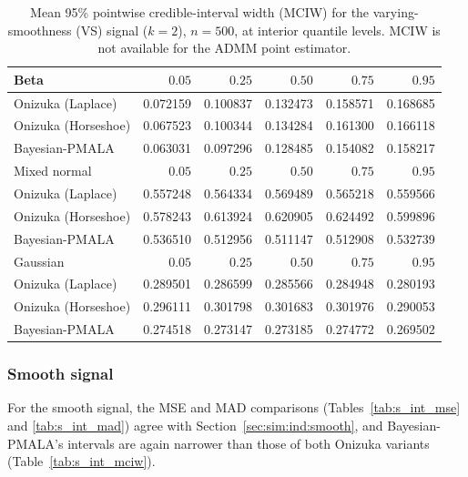 \begin{table}[!htbp]
\centering
\small
\caption{Mean 95\% pointwise credible-interval width (MCIW) for the varying-smoothness (VS) signal ($k=2$), $n=500$, at interior quantile levels. MCIW is not available for the ADMM point estimator.}
\label{tab:vs_int_mciw}
\begin{tabular}{lrrrrr}
\toprule
Beta & $0.05$ & $0.25$ & $0.50$ & $0.75$ & $0.95$ \\
\midrule
Onizuka (Laplace) & 0.072159 & 0.100837 & 0.132473 & 0.158571 & 0.168685 \\
Onizuka (Horseshoe) & 0.067523 & 0.100344 & 0.134284 & 0.161300 & 0.166118 \\
Bayesian-PMALA & 0.063031 & 0.097296 & 0.128485 & 0.154082 & 0.158217 \\
\midrule
Mixed normal & $0.05$ & $0.25$ & $0.50$ & $0.75$ & $0.95$ \\
\midrule
Onizuka (Laplace) & 0.557248 & 0.564334 & 0.569489 & 0.565218 & 0.559566 \\
Onizuka (Horseshoe) & 0.578243 & 0.613924 & 0.620905 & 0.624492 & 0.599896 \\
Bayesian-PMALA & 0.536510 & 0.512956 & 0.511147 & 0.512908 & 0.532739 \\
\midrule
Gaussian & $0.05$ & $0.25$ & $0.50$ & $0.75$ & $0.95$ \\
\midrule
Onizuka (Laplace) & 0.289501 & 0.286599 & 0.285566 & 0.284948 & 0.280193 \\
Onizuka (Horseshoe) & 0.296111 & 0.301798 & 0.301683 & 0.301976 & 0.290053 \\
Bayesian-PMALA & 0.274518 & 0.273147 & 0.273185 & 0.274772 & 0.269502 \\
\bottomrule
\end{tabular}
\end{table}

\clearpage
\subsubsection{Smooth signal}
\label{app:sim:individual:smooth}
For the smooth signal, the MSE and MAD comparisons (Tables~\ref{tab:s_int_mse} and \ref{tab:s_int_mad}) agree with Section~\ref{sec:sim:ind:smooth}, and Bayesian-PMALA's intervals are again narrower than those of both Onizuka variants (Table~\ref{tab:s_int_mciw}).


